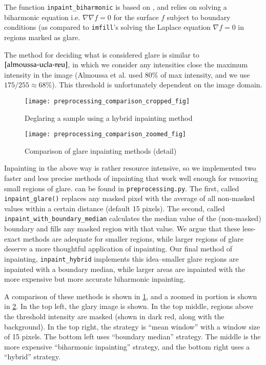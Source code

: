     The function \texttt{inpaint\_biharmonic} is based on \cite{damelin2018surface}, and relies on solving a
    biharmonic equation i.e. $\nabla \nabla f = 0$ for the surface $f$ subject to boundary conditions (as
    compared to \texttt{imfill}'s solving the Laplace equation $\nabla f = 0$ in regions marked as glare.
    
    The method for deciding what is considered glare is similar to $\cite{almoussa-ucla-reu}$, in which we
    consider any intensities close the maximum intensity in the image (Almoussa et al. used $80\%$ of max intensity, and we use $175/255 \approx 68\%$). This threshold is unfortunately dependent on the image domain.
    
        \begin{figure} 
        \texttt{[image: preprocessing\_comparison\_cropped\_fig]}
        \caption{Deglaring a sample using a hybrid inpainting method}
        \label{fig:glare-example-crop}
        \end{figure}

        \begin{figure} 
        \texttt{[image: preprocessing\_comparison\_zoomed\_fig]}
        \caption{Comparison of glare inpainting methods (detail)}
        \label{fig:glare-example-zoom}
        \end{figure}
    
    Inpainting in the above way is rather resource intensive, so we implemented two faster and less precise methods of inpainting that work well enough for removing small regions of glare.  can be found in \texttt{preprocessing.py}. The first, called 
    \texttt{inpaint\_glare()} replaces any masked pixel with the average of all non-masked values within a certain distance (default 15 pixels). The second, called \texttt{inpaint\_with\_boundary\_median} calculates the median value of the  (non-masked) boundary and fills any masked region with that value. We argue that these less-exact methods are adequate for smaller regions, while larger regions of glare deserve a more thoughtful application of inpainting. Our final method of inpainting, \texttt{inpaint\_hybrid} implements this idea--smaller glare regions are inpainted with a boundary median, while larger areas are inpainted with the more expensive but more accurate biharmonic inpainting.
    
    A comparison of these methods is shown in \cref{fig:glare-example-crop},
    and a zoomed in portion is shown in \cref{fig:glare-example-zoom}. In the top left, the glary image is shown.  In the top middle,
    regions above the threshold intensity are masked (shown in dark red, along with the background). In the top right, the strategy is ``mean window'' with a window size of 15 pixels. The bottom left uses ``boundary median'' strategy. The middle is the more expensive ``biharmonic inpainting'' strategy, and the bottom right uses a ``hybrid'' strategy.
    
